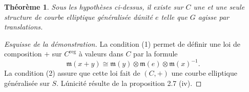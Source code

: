 \documentclass{amsart}
\theoremstyle{plain}
\newtheorem{theorem}{Th\'eor\`eme}[section]
\theoremstyle{remark}
\begin{document}
\begin{theorem}
Sous les hypoth\`eses ci-dessus, il existe sur $C$ une et une seule structure de courbe
elliptique g\'en\'eralis\'ee d\'unit\'e $e$ telle que $G$ agisse par translations.
\end{theorem}

\begin{proof}[Esquisse de la d\'emonstration]
La condition (1) permet de d\'efinir une loi de composition $+$ sur $C^{\mathrm{reg}}$ \`a valeurs
dans $C$ par la formule
\[
\mathfrak{m}(x+y) \cong \mathfrak{m}(y) \otimes \mathfrak{m}(e) \otimes
\mathfrak{m}(x)^{-1}.
\]
La condition (2) assure que cette loi fait de $(C, +)$ une courbe elliptique
g\'en\'eralis\'ee sur $S$. L\'unicit\'e r\'esulte de la proposition 2.7 (iv).
\end{proof}
\end{document}
